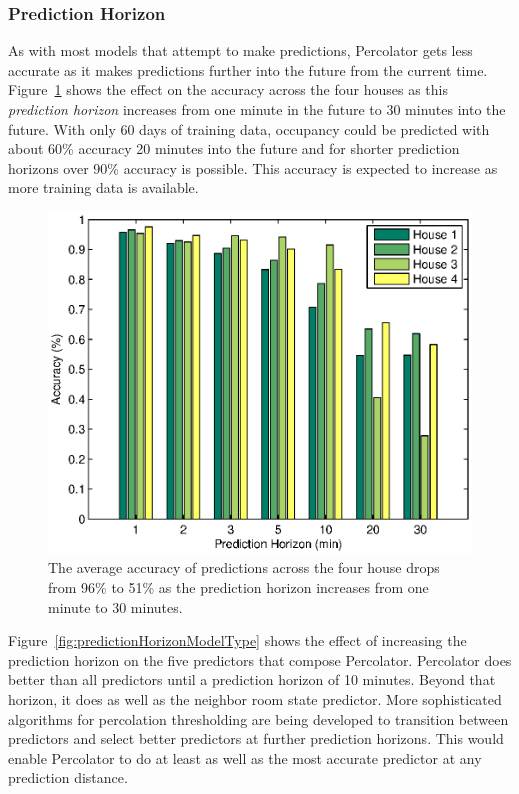 \subsubsection{Prediction Horizon}

As with most models that attempt to make predictions, Percolator gets less
accurate as it makes predictions further into the future from the current
time. Figure~\ref{fig:predictionHorizon} shows the effect on the accuracy across
the four houses as this {\em prediction horizon} increases from one minute in
the future to 30 minutes into the future. With only 60 days of training data,
occupancy could be predicted with about 60\% accuracy 20 minutes into the future
and for shorter prediction horizons over 90\% accuracy is possible. This
accuracy is expected to increase as more training data is available.

\begin{figure}[!htb]
\begin{center}
\includegraphics[width=0.6\columnwidth]{fig/predictionHorizonAccuracy.eps}
\end{center}
\caption[Sensitivity of Percolator to the prediction horizon]{The average
accuracy of predictions across the four house drops from 96\% to 51\% as the
prediction horizon increases from one minute to 30 minutes.}
\label{fig:predictionHorizon}
\end{figure}

Figure~\ref{fig:predictionHorizonModelType} shows the effect of increasing the
prediction horizon on the five predictors that compose Percolator. Percolator
does better than all predictors until a prediction horizon of 10 minutes. Beyond
that horizon, it does as well as the neighbor room state predictor. More
sophisticated algorithms for percolation thresholding are being developed to
transition between predictors and select better predictors at further prediction
horizons. This would enable Percolator to do at least as well as the most
accurate predictor at any prediction distance.

